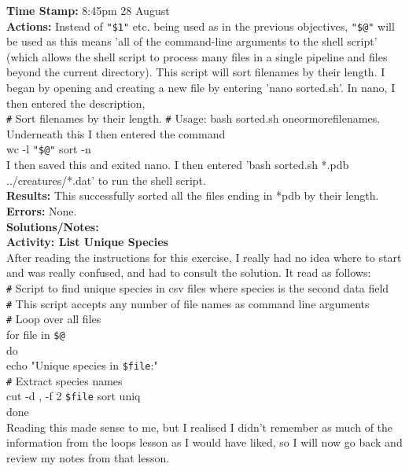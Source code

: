 \documentclass{article}
\begin{document}
\begin{FlushLeft}
\textbf{Time Stamp:} 8:45pm 28 August\\
\textbf{Actions:} Instead of \verb|"$1"| etc. being used as in the previous objectives, \verb|"$@"| will be used as this means 'all of the command-line arguments to the shell script' (which allows the shell script to process many files in a single pipeline and files beyond the current directory). This script will sort filenames by their length. I began by opening and creating a new file by entering 'nano sorted.sh'. In nano, I then entered the description,\\
\verb|#| Sort filenames by their length.
\verb|#| Usage: bash sorted.sh one\textunderscore or\textunderscore more\textunderscore filenames.\\
Underneath this I then entered the command\\
wc -l \verb|"$@"| \textbar{} sort -n\\
I then saved this and exited nano. I then entered 'bash sorted.sh *.pdb ../creatures/*.dat' to run the shell script.\\
\textbf{Results:} This successfully sorted all the files ending in *pdb by their length.\\
\textbf{Errors:} None.\\
\textbf{Solutions/Notes:}\\
\vspace{5mm}
\textbf{Activity: List Unique Species} \\
After reading the instructions for this exercise, I really had no idea where to start and was really confused, and had to consult the solution. It read as follows:\\
\verb|#| Script to find unique species in csv files where species is the second data field\\
\verb|#| This script accepts any number of file names as command line arguments\\
\verb|#| Loop over all files\\
for file in \verb|$@|\\
do\\
echo "Unique species in \verb|$file|:"\\
\verb|#| Extract species names\\
cut -d , -f 2 \verb|$file|\textbar{} sort \textbar{} uniq\\
done\\
Reading this made sense to me, but I realised I didn't remember as much of the information from the loops lesson as I would have liked, so I will now go back and review my notes from that lesson.\\

\end{FlushLeft}
\end{document}
